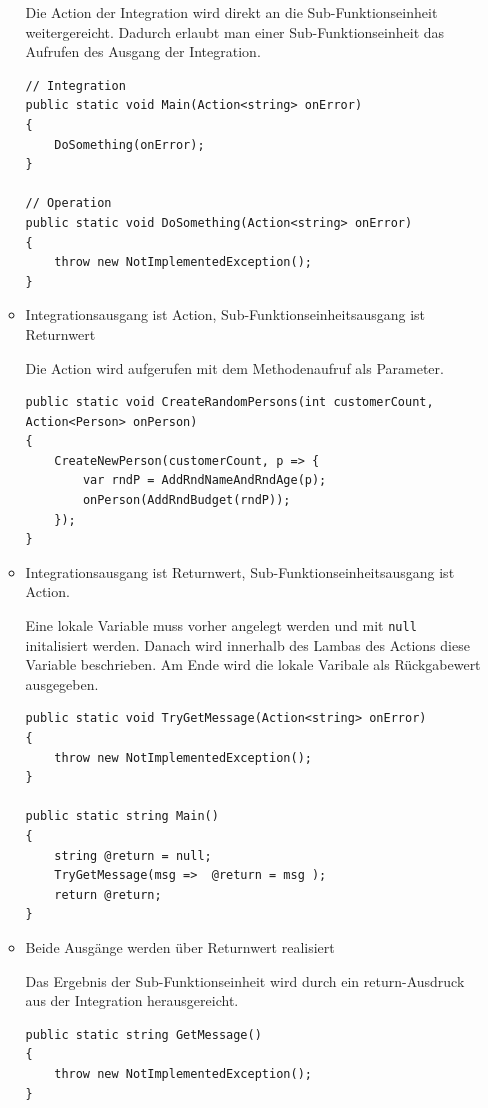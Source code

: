 \begin{enumerate}
\begin{itemize}
			Die Action der Integration wird direkt an die Sub-Funktionseinheit
			weitergereicht. Dadurch erlaubt man einer Sub-Funktionseinheit das
			Aufrufen des Ausgang der Integration.
			
			\begin{lstlisting}[caption=Action-Action-Beziehung]
// Integration
public static void Main(Action<string> onError)
{
	DoSomething(onError);
}

// Operation
public static void DoSomething(Action<string> onError)
{
	throw new NotImplementedException();
}
			\end{lstlisting}
			
			
			\item Integrationsausgang ist Action, Sub-Funktionseinheitsausgang ist
			Returnwert 
			
			Die Action wird aufgerufen mit dem Methodenaufruf als Parameter.
			
\begin{lstlisting}[caption=Action-Return-Beziehung]
public static void CreateRandomPersons(int customerCount, Action<Person> onPerson)
{
	CreateNewPerson(customerCount, p => {
		var rndP = AddRndNameAndRndAge(p);
		onPerson(AddRndBudget(rndP));
	});
}
\end{lstlisting}
			\item Integrationsausgang ist Returnwert, Sub-Funktionseinheitsausgang ist
			Action.
			
			Eine lokale Variable muss vorher angelegt werden und mit \texttt{null}
			initalisiert werden. Danach wird innerhalb des Lambas des Actions diese
			Variable beschrieben. Am Ende wird die lokale Varibale als Rückgabewert
			ausgegeben.
			
\begin{lstlisting}[caption=Return-Action-Beziehung]
public static void TryGetMessage(Action<string> onError)
{
	throw new NotImplementedException();
}

public static string Main()
{
	string @return = null;
	TryGetMessage(msg =>  @return = msg );
	return @return;	
}
\end{lstlisting}

			\item Beide Ausgänge werden über Returnwert realisiert
			
		    Das Ergebnis der Sub-Funktionseinheit wird durch ein return-Ausdruck aus der Integration herausgereicht.
		    
\begin{lstlisting}[caption=Return-Return-Beziehung]
public static string GetMessage()
{
	throw new NotImplementedException();
}


\end{lstlisting}
\end{itemize}
\end{enumerate}
